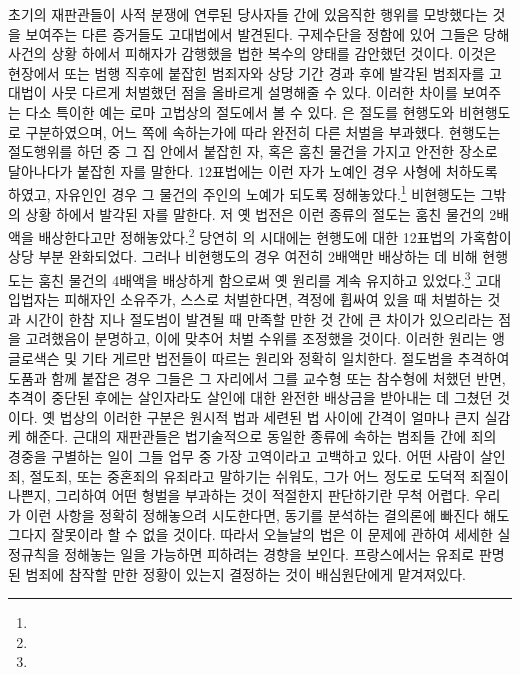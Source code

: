 초기의 재판관들이 사적 분쟁에 연루된 당사자들 간에 있음직한 행위를
모방했다는 것을 보여주는 다른 증거들도 고대법에서 발견된다.
구제수단을 정함에 있어
그들은 당해 사건의 상황 하에서 피해자가 감행했을 법한 복수의 양태를
감안했던 것이다.
이것은 현장에서 또는 범행 직후에 붙잡힌 범죄자와
상당 기간 경과 후에 발각된 범죄자를
고대법이
사뭇 다르게 처벌했던 점을 올바르게 설명해줄 수 있다.
이러한 차이를 보여주는 다소 특이한 예는 로마 고법상의 절도에서 볼 수 있다.
은 절도를
현행도와
비현행도로
구분하였으며,
어느 쪽에 속하는가에 따라 완전히 다른 처벌을 부과했다.
현행도는 절도행위를 하던 중 그 집 안에서 붙잡힌 자,
혹은 훔친 물건을 가지고 안전한 장소로 달아나다가 붙잡힌 자를 말한다.
12표법에는 이런 자가 노예인 경우 사형에 처하도록 하였고,
자유인인 경우 그 물건의 주인의 노예가 되도록 정해놓았다.\footnote{%
  }
비현행도는 그밖의 상황 하에서 발각된 자를 말한다.
저 옛 법전은 이런 종류의 절도는 훔친 물건의 2배액을 배상한다고만
정해놓았다.\footnote{%
  }
당연히
의 시대에는
현행도에 대한 12표법의 가혹함이 상당 부분 완화되었다.
그러나
비현행도의 경우 여전히 2배액만 배상하는 데 비해
현행도는 훔친 물건의 4배액을 배상하게 함으로써
옛 원리를 계속 유지하고 있었다.\footnote{%
  }
고대 입법자는
피해자인 소유주가,
스스로 처벌한다면,
격정에 휩싸여 있을 때 처벌하는 것과
시간이 한참 지나 절도범이 발견될 때 만족할 만한 것 간에
큰 차이가 있으리라는 점을 고려했음이 분명하고,
이에 맞추어 처벌 수위를 조정했을 것이다.
이러한 원리는 앵글로색슨 및 기타 게르만 법전들이 따르는 원리와
정확히 일치한다.
절도범을 추격하여 도품과 함께 붙잡은 경우 그들은
그 자리에서 그를 교수형 또는 참수형에 처했던 반면,
추격이 중단된 후에는 살인자라도 살인에 대한 완전한 배상금을 받아내는 데
그쳤던 것이다.
옛 법상의 이러한 구분은 원시적 법과 세련된 법 사이에
간격이 얼마나 큰지 실감케 해준다.
근대의 재판관들은
법기술적으로 동일한 종류에 속하는 범죄들 간에
죄의 경중을 구별하는 일이
그들 업무 중 가장 고역이라고 고백하고 있다.
어떤 사람이 살인죄, 절도죄, 또는 중혼죄의 유죄라고
말하기는 쉬워도, 그가 어느 정도로 도덕적 죄질이 나쁜지,
그리하여
어떤 형벌을 부과하는 것이 적절한지
판단하기란 무척 어렵다.
우리가 이런 사항을 정확히 정해놓으려 시도한다면,
동기를 분석하는 결의론에 빠진다 해도
그다지 잘못이라 할 수 없을 것이다.
따라서 오늘날의 법은
이 문제에 관하여 세세한 실정규칙을 정해놓는 일을
가능하면 피하려는 경향을 보인다.
프랑스에서는
유죄로 판명된 범죄에 참작할 만한 정황이 있는지 결정하는 것이
배심원단에게 맡겨져있다.
